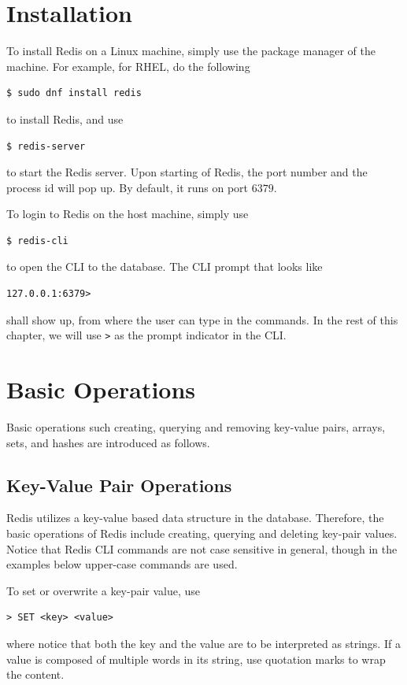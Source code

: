 \section{Installation}

To install Redis on a Linux machine, simply use the package manager of the machine. For example, for RHEL, do the following
\begin{lstlisting}
$ sudo dnf install redis
\end{lstlisting}
to install Redis, and use
\begin{lstlisting}
$ redis-server
\end{lstlisting}
to start the Redis server. Upon starting of Redis, the port number and the process id will pop up. By default, it runs on port $6379$.

To login to Redis on the host machine, simply use
\begin{lstlisting}
$ redis-cli
\end{lstlisting}
to open the CLI to the database. The CLI prompt that looks like
\begin{lstlisting}
127.0.0.1:6379>
\end{lstlisting}
shall show up, from where the user can type in the commands. In the rest of this chapter, we will use \verb|>| as the prompt indicator in the CLI.

\section{Basic Operations}

Basic operations such creating, querying and removing key-value pairs, arrays, sets, and hashes are introduced as follows.

\subsection{Key-Value Pair Operations}

Redis utilizes a key-value based data structure in the database. Therefore, the basic operations of Redis include creating, querying and deleting key-pair values. Notice that Redis CLI commands are not case sensitive in general, though in the examples below upper-case commands are used.

To set or overwrite a key-pair value, use
\begin{lstlisting}
> SET <key> <value>
\end{lstlisting}
where notice that both the key and the value are to be interpreted as strings. If a value is composed of multiple words in its string, use quotation marks to wrap the content.

